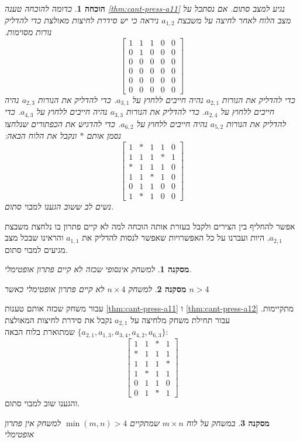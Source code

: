 \documentclass[12pt,leqno]{article}
\theoremstyle{theoremdd}
\newtheorem{corollary}{מסקנה}[section]
\newtheorem*{prove}{הוכחה}
\begin{document}
\begin{prove}
    כדומה להוכחה 
    טענה 
    \ref{thm:cant-press-a11}
    נגיע למצב סתום.
    אם נסתכל על מצב הלוח לאחר לחיצה על משבצת 
   $a_{1,2}$ 
   ניראה כי יש סידרת לחיצות מאולצת כדי להדליק נורות מסוימות.
   \[
        \begin{bmatrix}
            1 & 1 & 1 & 0 & 0 \\
            0 & 1 & 0 & 0 & 0 \\
            0 & 0 & 0 & 0 & 0 \\
            0 & 0 & 0 & 0 & 0 \\
            0 & 0 & 0 & 0 & 0 \\
            0 & 0 & 0 & 0 & 0
        \end{bmatrix}
    \]
    כדי להדליק את הנורות 
    $a_{2,1}$
    נהיה חייבים ללחוץ על 
    $a_{3,1}$.
    כדי להדליק את הנורות 
    $a_{2,3}$
    נהיה חייבים ללחוץ על 
    $a_{2,4}$.
    כדי להדליק את הנורות 
    $a_{3,3}$
    נהיה חייבים ללחוץ על 
    $a_{4,3}$.
    כדי להדליק את הנורות 
    $a_{5,2}$
    נהיה חייבים ללחוץ על 
    $a_{6,2}$.
    כדי להדגיש את הכפתורים שנלחצו נסמן
    אותם 
    $*$
    ונקבל את הלוח הבאה:
    \[
        \begin{bmatrix}
            1 & * & 1 & 1 & 0 \\
            1 & 1 & 1 & * & 1 \\
            * & 1 & 1 & 1 & 0 \\
            1 & 1 & * & 1 & 0 \\
            0 & 1 & 1 & 0 & 0 \\
            1 & * & 1 & 0 & 0
        \end{bmatrix}
    \]
    נשים לב ששוב הגענו למבוי סתום.
\end{prove}
אפשר להחליף בין הצירים ולקבל בעזרת אותה הוכחה 
למה לא קיים פתרון 
בו נלחצת משבצת 
$a_{2,1}$.
היות ועברנו על כל האפשרויות שאפשר 
לנסות להדליק את 
$a_{1,1}$
והראינו שבכל מצב מגיעים למבוי סתום.
\begin{corollary}
    למשחק אינסופי שכזה לא קיים פתרון אופטימלי.
\end{corollary}
\begin{corollary}
    למשחק 
    $ n \times 4$
    לא קיים פתרון אופטימלי
    כאשר 
    $n > 4$
\end{corollary}
עבור משחק שכזה
אותם 
טענות
\ref{thm:cant-press-a11}
ו
\ref{thm:cant-press-a12}
מתקיימות.
עבור 
תחילת משחק 
מלחיצה על 
$a_{2,1}$
נקבל את סידרת לחיצות המאולצת
$\{a_{2,1}, a_{1,3}, a_{3,4}, a_{4,2}, a_{6,3}\}$
שמתוארת בלוח הבאה:
\[
    \begin{bmatrix}
        1 & 1 & * & 1\\
        * & 1 & 1 & 1\\
        1 & 1 & 1 & *\\
        1 & * & 1 & 1\\
        0 & 1 & 1 & 0\\
        0 & 1 & * & 1
    \end{bmatrix}
\]
והגענו שוב למבוי סתום.
\begin{corollary}
    \label{thrm: bigger then 7x7 board no minimal solution}
    במשחק על לוח 
    $m \times n$
    שמתקיים
    $\min(m,n) > 4$
    למשחק אין פתרון אופטימלי
\end{corollary}
\end{document}
